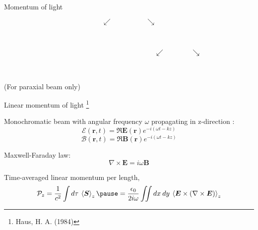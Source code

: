 \documentclass[12pt, dvipsnames]{beamer}
\numberwithin{equation}{section}
\newcommand\blfootnote[1]{%
	\begingroup
	\renewcommand\thefootnote{}\footnote{#1}%
	\addtocounter{footnote}{-1}%
	\endgroup
}
\begin{document}
\begin{frame}{Momentum of light}
	\begin{center}
		\vspace{-4mm}\pause
		$$\swarrow\hspace{2cm}\searrow$$\\\vspace{-4mm}\pause
		\hspace{1cm}\\ \vspace{-8mm}\pause
		$$\hspace{5cm}\swarrow\hspace{1.5cm}\searrow$$\\\vspace{-4mm}\pause
		\hspace{5cm}\hspace{1cm}\\\vspace{1cm}
		\alert{\centering (For paraxial beam only)}
		
	\end{center}
\end{frame}

\begin{frame}{Linear momentum of light}\blfootnote{Haus, H. A. (1984)}
	Monochromatic beam with angular frequency $\omega$ propagating in z-direction :
	$$\boldsymbol{\mathcal{E}}(\boldsymbol{r},t) = \Re{\boldsymbol{E}(\boldsymbol{r}) e^{-i(\omega t-kz )}}$$
	$$\boldsymbol{\mathcal{B}}(\boldsymbol{r},t) = \Re{\boldsymbol{B}(\boldsymbol{r}) e^{-i (\omega t-kz ) }}$$\pause
	
	Maxwell-Faraday law:
	$$\nabla\times\boldsymbol{E}= i\omega \boldsymbol{B} $$\pause
	
	Time-averaged linear momentum per length,
	$$\mathcal{P}_z = \frac{1}{c^2}\int d\tau\: \expval{\boldsymbol{S}}_z\pause
	=\frac{\epsilon_0}{2i\omega}\iint  dx\:dy\: \expval{\boldsymbol{E}\times (\nabla\times\boldsymbol{E})}_z$$
\end{frame}
\end{document}

